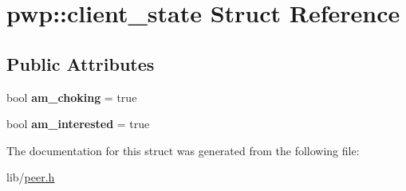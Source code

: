 \hypertarget{structpwp_1_1client__state}{}\section{pwp\+:\+:client\+\_\+state Struct Reference}
\label{structpwp_1_1client__state}
\subsection*{Public Attributes}
\begin{DoxyCompactItemize}
\item 
\mbox{\label{structpwp_1_1client__state_a134704e7cdd2e26181fead2dffc795e1}} 
bool {\bfseries am\+\_\+choking} = true
\item 
\mbox{\label{structpwp_1_1client__state_a8376b624ad153316a0a7317f99da97c2}} 
bool {\bfseries am\+\_\+interested} = true
\end{DoxyCompactItemize}


The documentation for this struct was generated from the following file\+:\begin{DoxyCompactItemize}
\item 
lib/\hyperlink{peer_8h}{peer.\+h}\end{DoxyCompactItemize}

